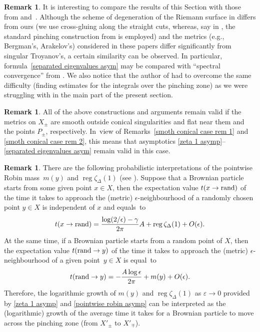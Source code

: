 \documentclass[pdftex]{sigma}
\numberwithin{equation}{section}
\theoremstyle{definition}
\newtheorem{Remark}[Theorem]{Remark}
\begin{document}
\begin{Remark} It is interesting to compare the results of this Section with those from \cite{Went} and~\cite{JWent}. Although the scheme of degeneration of the Riemann surface in \cite{JWent,Went} differs from ours (we use cross-gluing along the straight cuts, whereas, say in \cite{Went}, the standard pinching construction from \cite{Fay1} is employed) and the metrics (e.g., Bergman's, Arakelov's) considered in these papers differ significantly from singular Troyanov's, a certain similarity can be observed. In particular, formula~\eqref{separated eigenvalues asym} may be compared with ``spectral convergence'' from \cite{JWent}. We also notice that the author of \cite{Went} had to overcome the same difficulty (finding estimates for the integrals over the pinching zone) as we were struggling with in the main part of the present section.
\end{Remark}

\begin{Remark}\label{smoth conical case rem 3}
All of the above constructions and arguments remain valid if the metrics on $X_\pm$ are smooth outside conical singularities and flat near them and the points $P_\pm$, respectively. In~view of Remarks~\ref{smoth conical case rem 1} and \ref{smoth conical case rem 2}, this means that asymptotics \eqref{zeta 1 asymp}--\eqref{separated eigenvalues asym} remain valid in this case.
\end{Remark}

\begin{Remark}
There are the following probabilistic interpretations of the pointwise Robin mass~$m(y)$ and $\operatorname{reg}\zeta_\Delta(1)$ (see \cite[Theorem 4.2]{Steiners-Game}). Suppose that a Brownian particle starts from some given point $x\in X$, then the expectation value $t(x\to {\rm rand})$ of the time it takes to approach the (metric) $\epsilon$-neighbourhood of a randomly chosen point $y\in X$ is independent of $x$ and equals~to
\[t(x\to {\rm rand})=\frac{\log (2/\epsilon)-\gamma}{2\pi}A+\operatorname{reg}\zeta_\Delta(1)+O(\epsilon).\]
At the same time, if a Brownian particle starts from a random point of $X$, then the expectation value $t({\rm rand}\to y)$ of the time it takes to approach the (metric) $\epsilon$-neighbourhood of a given point~${y\in X}$ is equal~to
\[t({\rm rand}\to y)=-\frac{A\log \epsilon}{2\pi}+m(y)+O(\epsilon).\]
Therefore, the logarithmic growth of $m(y)$ and $\operatorname{reg}\zeta_\Delta(1)$ as $\varepsilon\to 0$ provided by \eqref{zeta 1 asymp} and \eqref{pointwise robin asymp} can be interpreted as the {\rm(}logarithmic{\rm)} growth of the average time it takes for a Brownian particle to move across the pinching zone (from $X'_\pm$ to $X'_\mp$).
\end{Remark}
\end{document}

